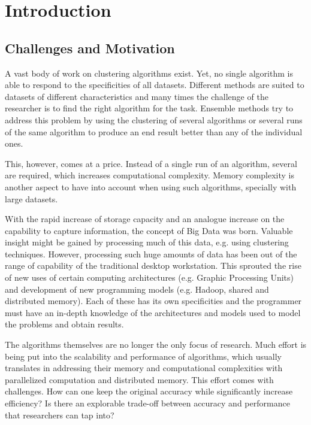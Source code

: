 \chapter{Introduction}
\label{chapter:introduction}


\section{Challenges and Motivation}

A vast body of work on clustering algorithms exist.
Yet, no single algorithm is able to respond to the specificities of all datasets.
Different methods are suited to datasets of different characteristics and many times the challenge of the researcher is to find the right algorithm for the task. %
Ensemble methods try to address this problem by using the clustering of several algorithms or several runs of the same algorithm to produce an end result better than any of the individual ones.

This, however, comes at a price.
Instead of a single run of an algorithm, several are required, which increases computational complexity.
Memory complexity is another aspect to have into account when using such algorithms, specially with large datasets.

With the rapid increase of storage capacity and an analogue increase on the capability to capture information, the concept of Big Data was born. %
Valuable insight might be gained by processing much of this data, e.g. using clustering techniques.
However, processing such huge amounts of data has been out of the range of capability of the traditional desktop workstation.
This sprouted the rise of new uses of certain computing architectures (e.g. Graphic Processing Units) and development of new programming models (e.g. Hadoop, shared and distributed memory).
Each of these has its own specificities and the programmer must have an in-depth knowledge of the architectures and models used to model the problems and obtain results.

The algorithms themselves are no longer the only focus of research.
Much effort is being put into the scalability and performance of algorithms, which usually translates in addressing their memory and computational complexities with parallelized computation and distributed memory.
This effort comes with challenges.
How can one keep the original accuracy while significantly increase efficiency? Is there an explorable trade-off between accuracy and performance that researchers can tap into?


